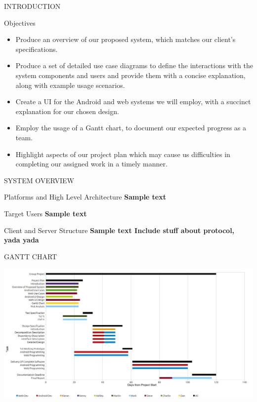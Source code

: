 \documentclass{article}
\begin{document}
\begin{section}{INTRODUCTION}
\begin{subsection}{Objectives}
			\begin{itemize}
				\item{Produce an overview of our proposed system, which matches our client's specifications.}
				\item{Produce a set of detailed use case diagrams to define the interactions with the system components and users and provide them with a concise explanation, along with example usage scenarios.}
				\item{Create a UI for the Android and web systems we will employ, with a succinct explanation for our chosen design.}
				\item{Employ the usage of a Gantt chart, to document our expected progress as a team.}
				\item{Highlight aspects of our project plan which may cause us difficulties in completing our assigned work in a timely manner.}
			\end{itemize}
		\end{subsection}
	\end{section}

	\newpage
	\begin{section}{SYSTEM OVERVIEW}
		\begin{subsection}{Platforms and High Level Architecture}
			\bf{Sample text}
		\end{subsection}
		
		\begin{subsection}{Target Users}
			\bf{Sample text}
		\end{subsection}
		
		\begin{subsection}{Client and Server Structure}
			\bf{Sample text}
			Include stuff about protocol, yada yada
		\end{subsection}
	\end{section}
	
	\newpage
	\begin{section}{GANTT CHART}
		\begin{center}
		\includegraphics[height=0.69\columnwidth, angle=90]{images/GanttChart/Gantt_Chart.jpg}
		\end{center}
	\end{section}
	
\end{document}
